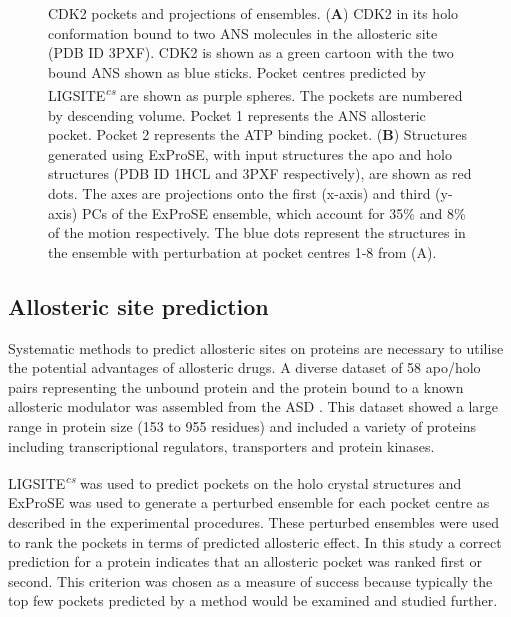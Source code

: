 \begin{figure}
\centering


\caption{CDK2 pockets and projections of ensembles.
(\textbf{A}) CDK2 in its holo conformation bound to two ANS molecules in the allosteric site (PDB ID 3PXF).
CDK2 is shown as a green cartoon with the two bound ANS shown as blue sticks.
Pocket centres predicted by LIGSITE\textsuperscript{\it cs} are shown as purple spheres.
The pockets are numbered by descending volume.
Pocket 1 represents the ANS allosteric pocket.
Pocket 2 represents the ATP binding pocket.
(\textbf{B}) Structures generated using ExProSE, with input structures the apo and holo structures (PDB ID 1HCL and 3PXF respectively), are shown as red dots.
The axes are projections onto the first (x-axis) and third (y-axis) PCs of the ExProSE ensemble, which account for 35\% and 8\% of the motion respectively.
The blue dots represent the structures in the ensemble with perturbation at pocket centres 1-8 from (A).}

\label{fig:cdk}
\end{figure}


\subsection{Allosteric site prediction}

Systematic methods to predict allosteric sites on proteins are necessary to utilise the potential advantages of allosteric drugs.
A diverse dataset of 58 apo/holo pairs representing the unbound protein and the protein bound to a known allosteric modulator was assembled from the ASD \cite{Shen2016}.
This dataset showed a large range in protein size (153 to 955 residues) and included a variety of proteins including transcriptional regulators, transporters and protein kinases.

LIGSITE\textsuperscript{\it cs} was used to predict pockets on the holo crystal structures and ExProSE was used to generate a perturbed ensemble for each pocket centre as described in the experimental procedures.
These perturbed ensembles were used to rank the pockets in terms of predicted allosteric effect.
In this study a correct prediction for a protein indicates that an allosteric pocket was ranked first or second.
This criterion was chosen as a measure of success because typically the top few pockets predicted by a method would be examined and studied further.


